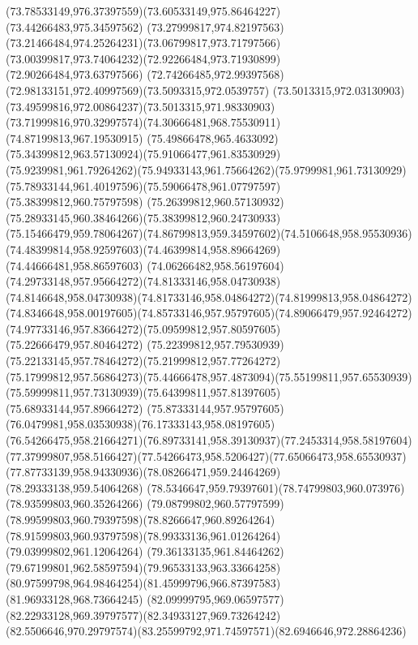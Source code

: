 {{  \curveto(73.78533149,976.37397559)(73.60533149,975.86464227)(73.44266483,975.34597562)
  \curveto(73.27999817,974.82197563)(73.21466484,974.25264231)(73.06799817,973.71797566)
  \curveto(73.00399817,973.74064232)(72.92266484,973.71930899)(72.90266484,973.63797566)
  \curveto(72.74266485,972.99397568)(72.98133151,972.40997569)(73.5093315,972.0539757)
  \curveto(73.5013315,972.03130903)(73.49599816,972.00864237)(73.5013315,971.98330903)
  \curveto(73.71999816,970.32997574)(74.30666481,968.75530911)(74.87199813,967.19530915)
  \curveto(75.49866478,965.4633092)(75.34399812,963.57130924)(75.91066477,961.83530929)
  \curveto(75.9239981,961.79264262)(75.94933143,961.75664262)(75.9799981,961.73130929)
  \curveto(75.78933144,961.40197596)(75.59066478,961.07797597)(75.38399812,960.75797598)
  \curveto(75.26399812,960.57130932)(75.28933145,960.38464266)(75.38399812,960.24730933)
  \curveto(75.15466479,959.78064267)(74.86799813,959.34597602)(74.5106648,958.95530936)
  \curveto(74.48399814,958.92597603)(74.46399814,958.89664269)(74.44666481,958.86597603)
  \curveto(74.06266482,958.56197604)(74.29733148,957.95664272)(74.81333146,958.04730938)
  \curveto(74.8146648,958.04730938)(74.81733146,958.04864272)(74.81999813,958.04864272)
  \curveto(74.8346648,958.00197605)(74.85733146,957.95797605)(74.89066479,957.92464272)
  \curveto(74.97733146,957.83664272)(75.09599812,957.80597605)(75.22666479,957.80464272)
  \curveto(75.22399812,957.79530939)(75.22133145,957.78464272)(75.21999812,957.77264272)
  \curveto(75.17999812,957.56864273)(75.44666478,957.4873094)(75.55199811,957.65530939)
  \curveto(75.59999811,957.73130939)(75.64399811,957.81397605)(75.68933144,957.89664272)
  \curveto(75.87333144,957.95797605)(76.0479981,958.03530938)(76.17333143,958.08197605)
  \curveto(76.54266475,958.21664271)(76.89733141,958.39130937)(77.2453314,958.58197604)
  \curveto(77.37999807,958.5166427)(77.54266473,958.5206427)(77.65066473,958.65530937)
  \curveto(77.87733139,958.94330936)(78.08266471,959.24464269)(78.29333138,959.54064268)
  \curveto(78.5346647,959.79397601)(78.74799803,960.073976)(78.93599803,960.35264266)
  \curveto(79.08799802,960.57797599)(78.99599803,960.79397598)(78.8266647,960.89264264)
  \curveto(78.91599803,960.93797598)(78.99333136,961.01264264)(79.03999802,961.12064264)
  \curveto(79.36133135,961.84464262)(79.67199801,962.58597594)(79.96533133,963.33664258)
  \curveto(80.97599798,964.98464254)(81.45999796,966.87397583)(81.96933128,968.73664245)
  \curveto(82.09999795,969.06597577)(82.22933128,969.39797577)(82.34933127,969.73264242)
  \curveto(82.5506646,970.29797574)(83.25599792,971.74597571)(82.6946646,972.28864236)
}}
